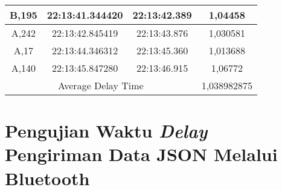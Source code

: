 \begin{table}[H]
\begin{tabular}{|ccc|c|}
    \multicolumn{1}{|c|}{B,195} & \multicolumn{1}{c|}{22:13:41.344420} & 22:13:42.389       & 1,04458                          \\ \hline
    \multicolumn{1}{|c|}{A,242} & \multicolumn{1}{c|}{22:13:42.845419} & 22:13:43.876       & 1,030581                         \\ \hline
    \multicolumn{1}{|c|}{A,17}  & \multicolumn{1}{c|}{22:13:44.346312} & 22:13:45.360       & 1,013688                         \\ \hline
    \multicolumn{1}{|c|}{A,140} & \multicolumn{1}{c|}{22:13:45.847280} & 22:13:46.915       & 1,06772                          \\ \hline
    \multicolumn{3}{|c|}{Average Delay Time}                                                & \multicolumn{1}{r|}{1,038982875} \\ \hline
  \end{tabular}
\end{table}


\section{Pengujian Waktu \emph{Delay} Pengiriman Data JSON Melalui Bluetooth}
\label{sec:delayBluetoothJSON}


